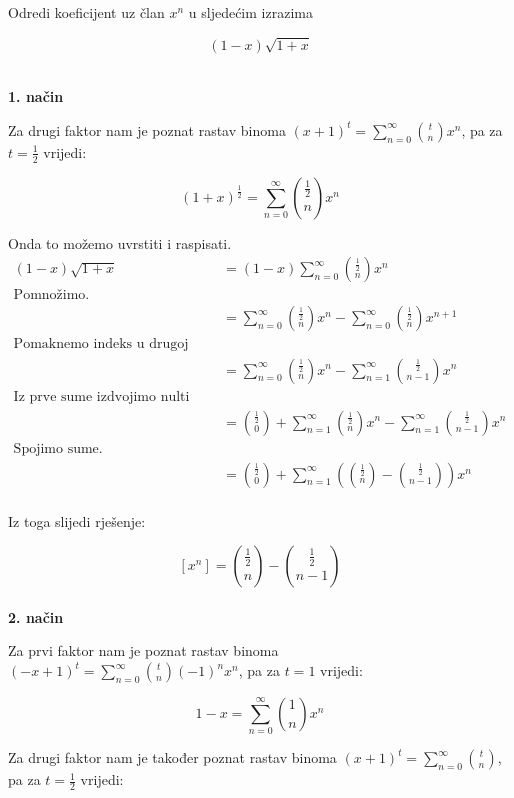 \documentclass[exam.tex]{subfiles}
\begin{document}
	\begin{subtask}
		Odredi koeficijent uz član \( x^n \) u sljedećim izrazima
	
		\[ (1 - x) \sqrt{1 + x} \] \\
	\end{subtask}
	
	\textbf{1. način}
	
	Za drugi faktor nam je poznat rastav binoma \( (x + 1)^t = \sum\limits^\infty_{n=0} \binom{t}{n} x^n \), pa za \( t = \frac{1}{2} \) vrijedi:
	
	\[ (1 + x)^{\frac{1}{2}} = \sum\limits^\infty_{n=0} \binom{\frac{1}{2}}{n} x^n \]
	
	Onda to možemo uvrstiti i raspisati.
	\begin{align*}
		(1 - x) \sqrt{1 + x} &= (1 - x) \sum\limits^\infty_{n=0} \binom{\frac{1}{2}}{n} x^n \\
		\text{Pomnožimo.} \\
		&= \sum\limits^\infty_{n=0} \binom{\frac{1}{2}}{n} x^n - \sum\limits^\infty_{n=0} \binom{\frac{1}{2}}{n} x^{n + 1} \\
		\text{Pomaknemo indeks u drugoj sumi.} \\
		&= \sum\limits^\infty_{n=0} \binom{\frac{1}{2}}{n} x^n - \sum\limits^\infty_{n=1} \binom{\frac{1}{2}}{n - 1} x^{n} \\
		\text{Iz prve sume izdvojimo nulti element.} \\
		&= \binom{\frac{1}{2}}{0} + \sum\limits^\infty_{n=1} \binom{\frac{1}{2}}{n} x^n - \sum\limits^\infty_{n=1} \binom{\frac{1}{2}}{n - 1} x^{n} \\
		\text{Spojimo sume.} \\
		&= \binom{\frac{1}{2}}{0} + \sum\limits^\infty_{n=1} \left ( \binom{\frac{1}{2}}{n} -  \binom{\frac{1}{2}}{n - 1} \right ) x^{n} \\
	\end{align*}
	
	Iz toga slijedi rješenje:
	
	\[ [x^n] = \binom{\frac{1}{2}}{n} - \binom{\frac{1}{2}}{n - 1} \] \\
	
	\textbf{2. način}
	
	Za prvi faktor nam je poznat rastav binoma \( (-x + 1)^t = \sum\limits^\infty_{n=0} \binom{t}{n} (-1)^n x^n \), pa za \( t = 1 \) vrijedi:
	
	\[ 1 - x = \sum\limits^\infty_{n=0} \binom{1}{n} x^n \]
	
	Za drugi faktor nam je također poznat rastav binoma \( (x + 1)^t = \sum\limits^\infty_{n=0} \binom{t}{n} \), pa za \( t = \frac{1}{2} \) vrijedi:
	
\end{document}
